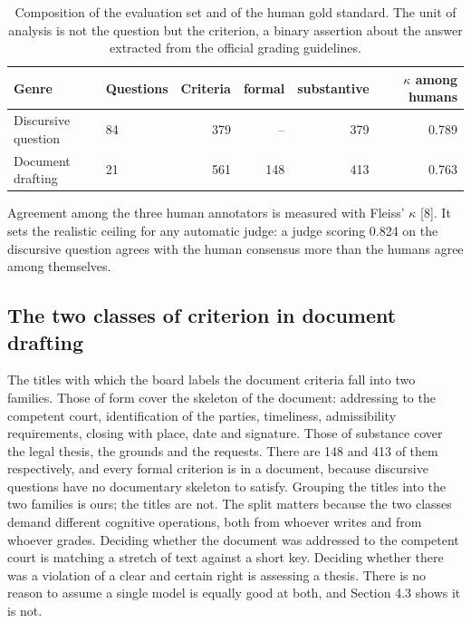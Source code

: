 \documentclass{IOS-Book-Article}
\begin{document}
\begin{table}[!ht]
\centering
\caption{Composition of the evaluation set and of the human gold standard. The unit of analysis is not the question but the criterion, a binary assertion about the answer extracted from the official grading guidelines.}
\footnotesize\setlength{\tabcolsep}{2pt}
\begin{tabular}{llrrrr}
\hline
\textbf{Genre} & \textbf{Questions} & \textbf{Criteria} & \textbf{formal} & \textbf{substantive} & \textbf{$\kappa$ among humans} \\
\hline
Discursive question & 84 & 379 & -- & 379 & 0.789 \\
Document drafting & 21 & 561 & 148 & 413 & 0.763 \\
\hline
\end{tabular}
\par\vspace{3pt}\begin{minipage}{\textwidth}\footnotesize Agreement among the three human annotators is measured with Fleiss' $\kappa$ [8]. It sets the realistic ceiling for any automatic judge: a judge scoring 0.824 on the discursive question agrees with the human consensus more than the humans agree among themselves.\end{minipage}
\end{table}


\subsection{The two classes of criterion in document drafting}

The titles with which the board labels the document criteria fall into two families. Those of form cover the skeleton of the document: addressing to the competent court, identification of the parties, timeliness, admissibility requirements, closing with place, date and signature. Those of substance cover the legal thesis, the grounds and the requests. There are 148 and 413 of them respectively, and every formal criterion is in a document, because discursive questions have no documentary skeleton to satisfy. Grouping the titles into the two families is ours; the titles are not. The split matters because the two classes demand different cognitive operations, both from whoever writes and from whoever grades. Deciding whether the document was addressed to the competent court is matching a stretch of text against a short key. Deciding whether there was a violation of a clear and certain right is assessing a thesis. There is no reason to assume a single model is equally good at both, and Section 4.3 shows it is not.
\end{document}
